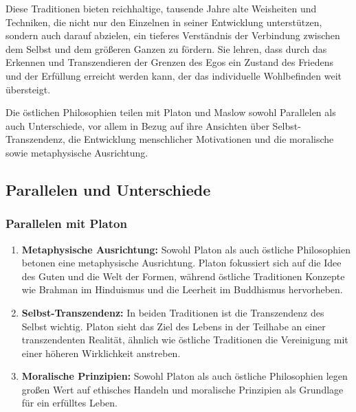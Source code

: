 \documentclass[12pt,a4paper]{article}
\begin{document}
Diese Traditionen bieten reichhaltige, tausende Jahre alte Weisheiten und Techniken, die nicht nur den Einzelnen in seiner Entwicklung unterstützen, sondern auch darauf abzielen, ein tieferes Verständnis der Verbindung zwischen dem Selbst und dem größeren Ganzen zu fördern. Sie lehren, dass durch das Erkennen und Transzendieren der Grenzen des Egos ein Zustand des Friedens und der Erfüllung erreicht werden kann, der das individuelle Wohlbefinden weit übersteigt.

Die östlichen Philosophien teilen mit Platon und Maslow sowohl Parallelen als auch Unterschiede, vor allem in Bezug auf ihre Ansichten über Selbst-Transzendenz, die Entwicklung menschlicher Motivationen und die moralische sowie metaphysische Ausrichtung.

\subsection[short]{Parallelen und Unterschiede}

\subsubsection*{Parallelen mit Platon}
\begin{enumerate}

  \item 
  \textbf{Metaphysische Ausrichtung:} Sowohl Platon als auch östliche Philosophien betonen eine metaphysische Ausrichtung. Platon fokussiert sich auf die Idee des Guten und die Welt der Formen, während östliche Traditionen Konzepte wie Brahman im Hinduismus und die Leerheit im Buddhismus hervorheben.
  
  \item 
  \textbf{Selbst-Transzendenz:} In beiden Traditionen ist die Transzendenz des Selbst wichtig. Platon sieht das Ziel des Lebens in der Teilhabe an einer transzendenten Realität, ähnlich wie östliche Traditionen die Vereinigung mit einer höheren Wirklichkeit anstreben.
  
  \item 
  \textbf{Moralische Prinzipien:} Sowohl Platon als auch östliche Philosophien legen großen Wert auf ethisches Handeln und moralische Prinzipien als Grundlage für ein erfülltes Leben.
\end{enumerate}
\end{document}

